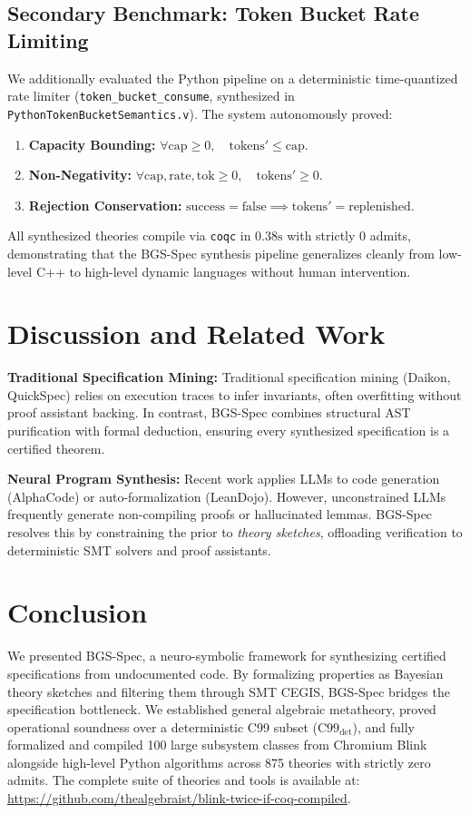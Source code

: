 \documentclass[10pt,journal,compsoc]{IEEEtran}
\begin{document}
\subsection{Secondary Benchmark: Token Bucket Rate Limiting}
We additionally evaluated the Python pipeline on a deterministic time-quantized rate limiter (\texttt{token\_bucket\_consume}, synthesized in \texttt{PythonTokenBucketSemantics.v}). The system autonomously proved:
\begin{enumerate}
    \item \textbf{Capacity Bounding:} $\forall \text{cap} \ge 0, \quad \text{tokens}' \le \text{cap}$.
    \item \textbf{Non-Negativity:} $\forall \text{cap}, \text{rate}, \text{tok} \ge 0, \quad \text{tokens}' \ge 0$.
    \item \textbf{Rejection Conservation:} $\text{success} = \text{false} \implies \text{tokens}' = \text{replenished}$.
\end{enumerate}
All synthesized theories compile via \texttt{coqc} in $0.38\text{s}$ with strictly 0 admits, demonstrating that the BGS-Spec synthesis pipeline generalizes cleanly from low-level C++ to high-level dynamic languages without human intervention.

\section{Discussion and Related Work}

\noindent\textbf{Traditional Specification Mining:}
Traditional specification mining (Daikon, QuickSpec) relies on execution traces to infer invariants, often overfitting without proof assistant backing. In contrast, BGS-Spec combines structural AST purification with formal deduction, ensuring every synthesized specification is a certified theorem.

\noindent\textbf{Neural Program Synthesis:}
Recent work applies LLMs to code generation (AlphaCode) or auto-formalization (LeanDojo). However, unconstrained LLMs frequently generate non-compiling proofs or hallucinated lemmas. BGS-Spec resolves this by constraining the prior to \emph{theory sketches}, offloading verification to deterministic SMT solvers and proof assistants.

\section{Conclusion}

We presented BGS-Spec, a neuro-symbolic framework for synthesizing certified specifications from undocumented code. By formalizing properties as Bayesian theory sketches and filtering them through SMT CEGIS, BGS-Spec bridges the specification bottleneck. We established general algebraic metatheory, proved operational soundness over a deterministic C99 subset ($\text{C99}_{\text{det}}$), and fully formalized and compiled 100 large subsystem classes from Chromium Blink alongside high-level Python algorithms across 875 theories with strictly zero admits. The complete suite of theories and tools is available at: \url{https://github.com/thealgebraist/blink-twice-if-coq-compiled}.
\end{document}
